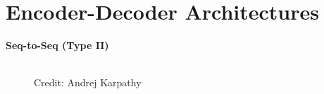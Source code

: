 \section{Encoder-Decoder Architectures}


\begin{frame}


\vspace{15mm}
\hspace{25mm} \textbf{\LARGE{Seq-to-Seq (Type II)}}
\begin{figure}
      \centering
      \tiny{\\Credit: Andrej Karpathy}
  \end{figure}
  
\end{frame}

